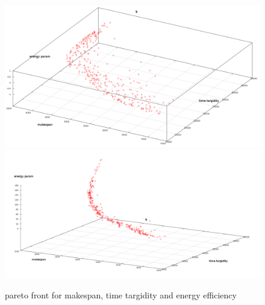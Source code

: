 \begin{figure}[h]
\centering
    \includegraphics[width=1.0\columnwidth]{pareto2}
    \includegraphics[width=1.0\columnwidth]{pareto}
    \caption{pareto front for makespan, time targidity and energy efficiency}
\label{pareto}
\end{figure}

